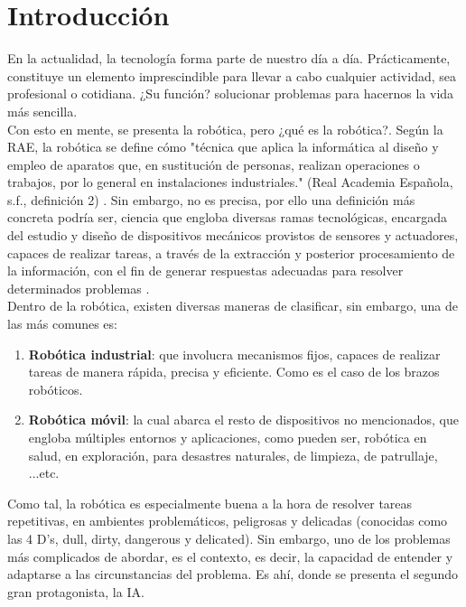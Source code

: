 \chapter{Introducción}
\label{cap:capitulo1}
\setcounter{page}{1}

En la actualidad, la tecnología forma parte de nuestro día a día. Prácticamente, constituye un elemento imprescindible para llevar a cabo cualquier actividad, sea profesional o cotidiana. ¿Su función? solucionar problemas para hacernos la vida más sencilla.\\

Con esto en mente, se presenta la robótica, pero ¿qué es la robótica?. Según la \ac{RAE}, la robótica se define cómo "técnica que aplica la informática al diseño y empleo de aparatos que, en sustitución de personas, realizan operaciones o trabajos, por lo general en instalaciones industriales." (Real Academia Española, s.f., definición 2) \cite{rae-robotica}. Sin embargo, no es precisa, por ello una definición más concreta podría ser, ciencia que engloba diversas ramas tecnológicas, encargada del estudio y diseño de dispositivos mecánicos provistos de sensores y actuadores, capaces de realizar tareas, a través de la extracción y posterior procesamiento de la información, con el fin de generar respuestas adecuadas para resolver determinados problemas \cite{revista-de-robots}.\\

Dentro de la robótica, existen diversas maneras de clasificar, sin embargo, una de las más comunes es:

\begin{enumerate}
	\item \textbf{Robótica industrial}: que involucra mecanismos fijos, capaces de realizar tareas de manera rápida, precisa y eficiente. Como es el caso de los brazos robóticos.

	\item \textbf{Robótica móvil}: la cual abarca el resto de dispositivos no mencionados, que engloba múltiples entornos y aplicaciones, como pueden ser, robótica en salud, en exploración, para desastres naturales, de limpieza, de patrullaje, ...etc.
\end{enumerate}

Como tal, la robótica es especialmente buena a la hora de resolver tareas repetitivas, en ambientes problemáticos, peligrosas y delicadas (conocidas como las 4 D's, dull, dirty, dangerous y delicated). Sin embargo, uno de los problemas más complicados de abordar, es el contexto, es decir, la capacidad de entender y adaptarse a las circunstancias del problema. Es ahí, donde se presenta el segundo gran protagonista, la \ac{IA}.\\

